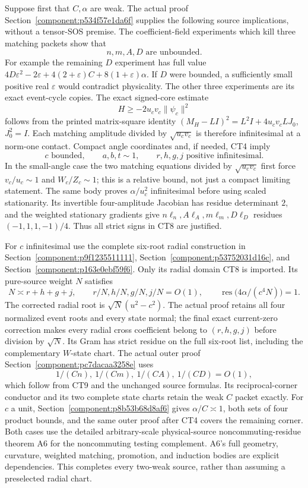 Suppose first that \(C,\alpha\) are weak.  The actual proof
Section~\ref{component:p534f57e1da6f} supplies the following source implications,
without a tensor-SOS premise.  The coefficient-field experiments
which kill three matching packets show that
\[
                    n,m,A,D\text{ are unbounded}.             \tag{CT7}
\]
For example the remaining \(D\) experiment has full value
\(4D\varepsilon^2-2\varepsilon+4(2+\varepsilon)C
+8(1+\varepsilon)\alpha\).
If \(D\) were bounded, a sufficiently small positive real
\(\varepsilon\) would contradict physicality.  The other three
experiments are its exact event-cycle copies.
The exact signed-core estimate
\[
 H\geq-2u_cv_c\|\psi_c\|^2
\]
follows from the printed matrix-square identity
\((M_H-LI)^2=L^2I+4u_cv_cLJ_0\), \(J_0^2=I\).
Each matching amplitude divided by \(\sqrt{u_cv_c}\) is therefore
infinitesimal at a norm-one contact.  Compact angle coordinates
and, if needed, CT4 imply
\[
 c\text{ bounded},\qquad a,b,t\sim1,\qquad
 r,h,g,j\text{ positive infinitesimal}.                    \tag{CT8}
\]
In the small-angle case the two matching equations divided by
\(\sqrt{u_cv_c}\) first force \(v_c/u_c\sim1\) and \(W_c/Z_c\sim1\);
this is a relative bound, not just a compact limiting statement.
The same body proves \(\alpha/u_c^2\) infinitesimal before using
scaled stationarity.  Its invertible four-amplitude Jacobian has
residue determinant \(2\), and the weighted stationary gradients
give \(n\ell_n,A\ell_A,m\ell_m,D\ell_D\) residues
\((-1,1,1,-1)/4\).  Thus all strict signs in CT8 are justified.

For \(c\) infinitesimal use the complete six-root radial construction
in Section~\ref{component:p9f1235511111}, Section~\ref{component:p53752031d16c}, and
Section~\ref{component:p163e0ebf59f6}.  Only its radial domain CT8 is imported.
Its pure-source weight \(N\) satisfies
\[
 N\asymp r+h+g+j,\qquad
 r/N,h/N,g/N,j/N=O(1),\qquad
 \operatorname{res}\bigl(4\alpha/(c^4N)\bigr)=1.          \tag{CT9}
\]
The corrected radial root is \(\sqrt N(u^2-c^2)\).
The actual proof retains all four normalized event roots and every
state normal; the final exact current-zero correction makes every
radial cross coefficient belong to \((r,h,g,j)\) before division
by \(\sqrt N\).  Its Gram has strict residue on the full six-root
list, including the complementary \(W\)-state chart.
The actual outer proof Section~\ref{component:pc7dacaa3258e}
uses
\[
             1/(Cn),\ 1/(Cm),\ 1/(CA),\ 1/(CD)=O(1),
\]
which follow from
CT9 and the unchanged source formulas.  Its reciprocal-corner
conductor and its two complete state charts retain the weak \(C\)
packet exactly.
For \(c\) a unit, Section~\ref{component:p8b53b68d8af6} gives
\(\alpha/C\asymp1\), both sets of four product bounds, and the
same outer proof after CT4 covers the remaining corner.
Both cases use the detailed arbitrary-scale physical-source
noncommuting-residue theorem A6 for the noncommuting testing
complement.  A6's full geometry, curvature, weighted matching,
promotion, and induction bodies are explicit dependencies.
This completes every two-weak source, rather than assuming a
preselected radial chart.

